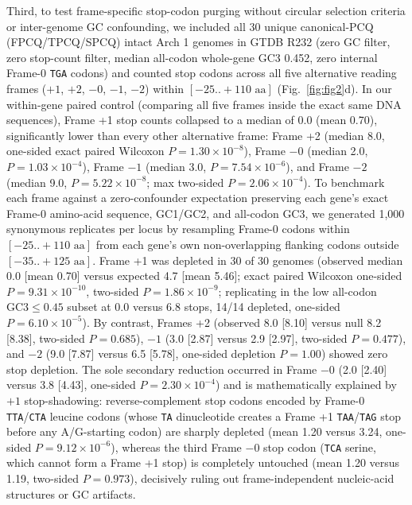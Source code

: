\documentclass[10pt,letterpaper]{article}
\begin{document}
Third, to test frame-specific stop-codon purging without circular selection criteria or inter-genome GC confounding, we included all 30 unique canonical-PCQ (FPCQ/TPCQ/SPCQ) intact Arch 1 genomes in GTDB R232 (zero GC filter, zero stop-count filter, median all-codon whole-gene GC3 0.452, zero internal Frame-0 \texttt{TGA} codons) and counted stop codons across all five alternative reading frames ($+1$, $+2$, $-0$, $-1$, $-2$) within $[-25..+110\text{ aa}]$ (Fig.~\ref{fig:fig2}d). In our within-gene paired control (comparing all five frames inside the exact same DNA sequences), Frame +1 stop counts collapsed to a median of 0.0 (mean 0.70), significantly lower than every other alternative frame: Frame +2 (median 8.0, one-sided exact paired Wilcoxon $P = 1.30 \times 10^{-8}$), Frame $-0$ (median 2.0, $P = 1.03 \times 10^{-4}$), Frame $-1$ (median 3.0, $P = 7.54 \times 10^{-6}$), and Frame $-2$ (median 9.0, $P = 5.22 \times 10^{-8}$; max two-sided $P = 2.06 \times 10^{-4}$). To benchmark each frame against a zero-confounder expectation preserving each gene's exact Frame-0 amino-acid sequence, GC1/GC2, and all-codon GC3, we generated 1,000 synonymous replicates per locus by resampling Frame-0 codons within $[-25..+110\text{ aa}]$ from each gene's own non-overlapping flanking codons outside $[-35..+125\text{ aa}]$. Frame +1 was depleted in 30 of 30 genomes (observed median 0.0 [mean 0.70] versus expected 4.7 [mean 5.46]; exact paired Wilcoxon one-sided $P = 9.31 \times 10^{-10}$, two-sided $P = 1.86 \times 10^{-9}$; replicating in the low all-codon $\text{GC3} \le 0.45$ subset at 0.0 versus 6.8 stops, 14/14 depleted, one-sided $P = 6.10 \times 10^{-5}$). By contrast, Frames +2 (observed 8.0 [8.10] versus null 8.2 [8.38], two-sided $P = 0.685$), $-1$ (3.0 [2.87] versus 2.9 [2.97], two-sided $P = 0.477$), and $-2$ (9.0 [7.87] versus 6.5 [5.78], one-sided depletion $P = 1.00$) showed zero stop depletion. The sole secondary reduction occurred in Frame $-0$ (2.0 [2.40] versus 3.8 [4.43], one-sided $P = 2.30 \times 10^{-4}$) and is mathematically explained by $+1$ stop-shadowing: reverse-complement stop codons encoded by Frame-0 \texttt{TTA}/\texttt{CTA} leucine codons (whose \texttt{TA} dinucleotide creates a Frame +1 \texttt{TAA}/\texttt{TAG} stop before any A/G-starting codon) are sharply depleted (mean 1.20 versus 3.24, one-sided $P = 9.12 \times 10^{-6}$), whereas the third Frame $-0$ stop codon (\texttt{TCA} serine, which cannot form a Frame +1 stop) is completely untouched (mean 1.20 versus 1.19, two-sided $P = 0.973$), decisively ruling out frame-independent nucleic-acid structures or GC artifacts.
\end{document}
